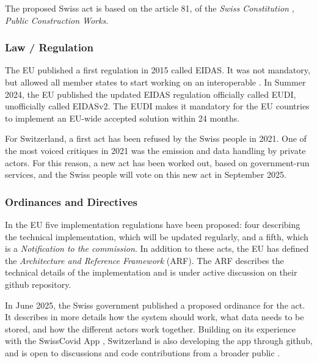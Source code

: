 The proposed Swiss \eid act is based on the article 81, of the \emph{Swiss Constitution} \cite{SwissConstitution}, \emph{Public Construction Works}.

\subsubsection{Law / Regulation}

The EU published a first regulation in 2015 called EIDAS\cite{EIDAS}.
It was not mandatory, but allowed all member states to start working on an
interoperable \eid.
In Summer 2024, the EU published the updated EIDAS regulation 
officially called EUDI\cite{EUDI}, unofficially called EIDASv2.
The EUDI makes it mandatory for the EU countries to implement an EU-wide accepted
\eid solution within 24 months.

For Switzerland, a first \eid act has been refused by the Swiss people in 2021\cite{CHeID21}.
One of the most voiced critiques in 2021 was the emission and data handling by
private actors.
For this reason, a new \eid act has been worked out, based on government-run services,
and the Swiss people will vote on this new act in September 2025\cite{SwiyuAct25}.

\subsubsection{Ordinances and Directives}

In the EU five implementation regulations have been proposed\cite{EUDIReg24}:
four describing the technical implementation, which will be
updated regularly, and a fifth, which is a \emph{Notification to the commission}.
In addition to these acts, the EU has defined the \emph{Architecture and Reference Framework
}(ARF)\cite{EUARF25}.
The ARF describes the technical details of the implementation and is under active
discussion on their github repository.

In June 2025, the Swiss government published a proposed ordinance for the
\eid act\cite{SwiyuOrdinance25}.
It describes in more details how the system should work, what data needs to be stored,
and how the different actors work together.
Building on its experience with the SwissCovid App \cite{SwisscovidGithub}, Switzerland is also
developing the \swiyu app through github, and is open to discussions
and code contributions from a broader public \cite{SwiyuGithub}.